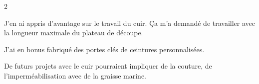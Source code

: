 \documentclass[a4paper,11pt]{article}
\begin{document}
\begin{blogmain}
\begin{multicols}{2}
\end{multicols}

J'en ai appris d'avantage sur le travail du cuir.
Ça m'a demandé de travailler avec la longueur maximale du plateau de découpe.


J'ai en bonus fabriqué des portes clés de ceintures personnalisées.

De futurs projets avec le cuir pourraient impliquer de la couture, de l'imperméabilisation avec de la graisse marine.
\end{blogmain}
\end{document}
